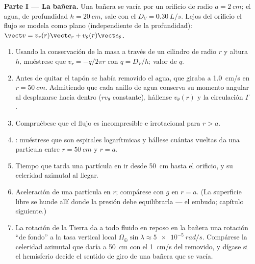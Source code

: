 \begin{problem}
\label{pb:b2:fluid-kinematics:1}

\medskip
\noindent\textbf{Parte I --- La bañera.}
Una bañera se vacía por un orificio de radio $a = \qty{2}{cm}$; el agua, de
profundidad $h = \qty{20}{cm}$, sale con el  $D_V =
\qty{0.30}{L/s}$. Lejos del orificio el flujo se modela como plano
(independiente de la profundidad): $\vect v = v_r(r)\vect e_r + v_\theta(r)\vect e_\theta$.
\begin{enumerate}
  \item Usando la conservación de la masa a través de un cilindro de
        radio $r$ y altura $h$, muéstrese que $v_r = -q/2\pi r$ con
        $q = D_V/h$; valor de $q$.
  \item Antes de quitar el tapón se había removido el agua, que giraba
        a \qty{1.0}{cm/s} en $r = \qty{50}{cm}$. Admitiendo que cada
        anillo de agua conserva su momento angular al desplazarse hacia
        dentro ($rv_\theta$ constante), hállense $v_\theta(r)$ y la
        circulación $\Gamma$.
  \item Compruébese que el flujo es incompresible e irrotacional para
        $r > a$.
  \item {}: muéstrese que son espirales logarítmicas y
        hállese cuántas vueltas da una partícula entre $r = \qty{50}{cm}$
        y $r = a$.
  \item Tiempo que tarda una partícula en ir desde \qty{50}{cm} hasta el
        orificio, y su celeridad azimutal al llegar.
  \item Aceleración de una partícula en $r$; compárese con $g$ en $r = a$.
        (La superficie libre se hunde allí donde la presión debe
        equilibrarla --- el embudo; capítulo siguiente.)
  \item La rotación de la Tierra da a todo fluido en reposo en la bañera
        una rotación ``de fondo'' a la tasa vertical local
        $\Omega_\oplus\sin\lambda \approx \qty{5e-5}{rad/s}$. Compárese la
        celeridad azimutal que daría a \qty{50}{cm} con el
        \qty{1}{cm/s} del removido, y dígase si el hemisferio decide el
        sentido de giro de una bañera que se vacía.
\end{enumerate}


\end{problem}
